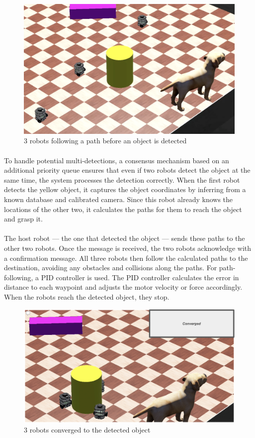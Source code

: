 \begin{figure} [H]
    \centering
    \includegraphics[width=0.75\linewidth]{assets/images/simulation_overview/isometricoverview.png}
    \caption{3 robots following a path before an object is detected}
    \label{fig:following-path}
\end{figure}

\paragraph*{}
To handle potential multi-detections, a consensus mechanism based on an additional priority queue ensures that even if two robots detect the object at the same time, the system processes the detection correctly. When the first robot detects the yellow object, it captures the object coordinates by inferring from a known database and calibrated camera. Since this robot already knows the locations of the other two, it calculates the paths for them to reach the object and grasp it.

\paragraph*{}
The host robot — the one that detected the object — sends these paths to the other two robots. Once the message is received, the two robots acknowledge with a confirmation message. All three robots then follow the calculated paths to the destination, avoiding any obstacles and collisions along the paths. For path-following, a PID controller is used. The PID controller calculates the error in distance to each waypoint and adjusts the motor velocity or force accordingly. When the robots reach the detected object, they stop.

\begin{figure} [H]
    \centering
    \includegraphics[width=0.75\linewidth]{assets/images/simulation_overview/coverged.png}
    \caption{3 robots converged to the detected object}
    \label{fig:converged}
\end{figure}

